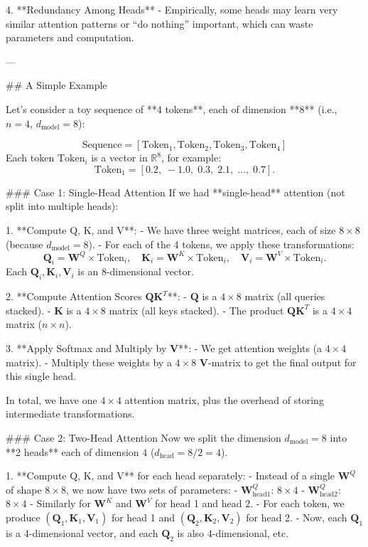 4. **Redundancy Among Heads**  
   - Empirically, some heads may learn very similar attention patterns or “do nothing” important, which can waste parameters and computation.  

---

## A Simple Example

Let’s consider a toy sequence of **4 tokens**, each of dimension **8** (i.e., \(n = 4\), \(d_{\text{model}} = 8\)):

\[
\text{Sequence} = [\text{Token}_1, \text{Token}_2, \text{Token}_3, \text{Token}_4]
\]
Each token \(\text{Token}_i\) is a vector in \(\mathbb{R}^8\), for example:  
\[
\text{Token}_1 = [0.2,\; -1.0,\; 0.3,\; 2.1,\; \ldots,\; 0.7].
\]

### Case 1: Single-Head Attention
If we had **single-head** attention (not split into multiple heads):

1. **Compute Q, K, and V**:  
   - We have three weight matrices, each of size \(8 \times 8\) (because \(d_{\text{model}} = 8\)).  
   - For each of the 4 tokens, we apply these transformations:
     \[
     \mathbf{Q}_i = \mathbf{W}^Q \times \text{Token}_i, \quad
     \mathbf{K}_i = \mathbf{W}^K \times \text{Token}_i, \quad
     \mathbf{V}_i = \mathbf{W}^V \times \text{Token}_i.
     \]
     Each \(\mathbf{Q}_i, \mathbf{K}_i, \mathbf{V}_i\) is an 8-dimensional vector.

2. **Compute Attention Scores \(\mathbf{Q}\mathbf{K}^T\)**:  
   - \(\mathbf{Q}\) is a \(4 \times 8\) matrix (all queries stacked).  
   - \(\mathbf{K}\) is a \(4 \times 8\) matrix (all keys stacked).  
   - The product \(\mathbf{Q} \mathbf{K}^T\) is a \(4 \times 4\) matrix (\(n \times n\)).  

3. **Apply Softmax and Multiply by \(\mathbf{V}\)**:  
   - We get attention weights (a \(4 \times 4\) matrix).  
   - Multiply these weights by a \(4 \times 8\) \(\mathbf{V}\)-matrix to get the final output for this single head.

In total, we have one \(4 \times 4\) attention matrix, plus the overhead of storing intermediate transformations.

### Case 2: Two-Head Attention
Now we split the dimension \(d_{\text{model}}=8\) into **2 heads** each of dimension \(4\) (\(d_{\text{head}} = 8/2 = 4\)).

1. **Compute Q, K, and V** for each head separately:  
   - Instead of a single \(\mathbf{W}^Q\) of shape \(8 \times 8\), we now have two sets of parameters:  
     - \(\mathbf{W}^Q_{\text{head1}}\): \(8 \times 4\)  
     - \(\mathbf{W}^Q_{\text{head2}}\): \(8 \times 4\)  
   - Similarly for \(\mathbf{W}^K\) and \(\mathbf{W}^V\) for head 1 and head 2.  
   - For each token, we produce \((\mathbf{Q}_1, \mathbf{K}_1, \mathbf{V}_1)\) for head 1 and \((\mathbf{Q}_2, \mathbf{K}_2, \mathbf{V}_2)\) for head 2.  
   - Now, each \(\mathbf{Q}_1\) is a 4-dimensional vector, and each \(\mathbf{Q}_2\) is also 4-dimensional, etc.

